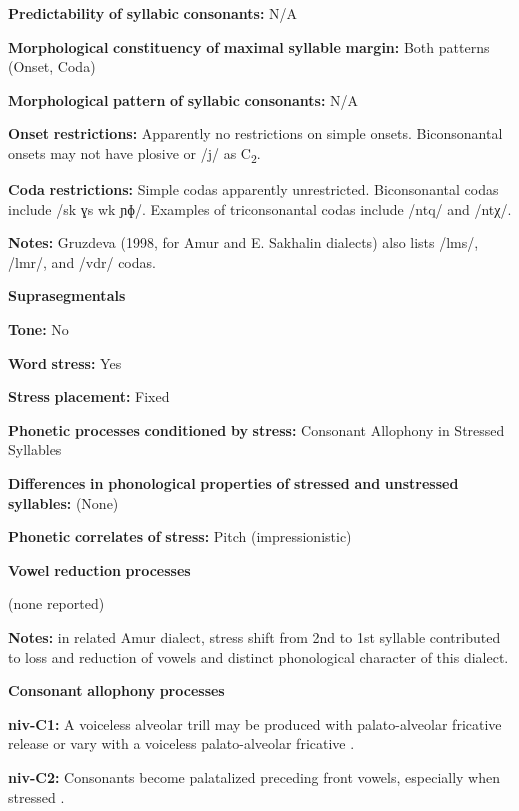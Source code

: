 \begin{styleBody}
\textbf{Predictability} \textbf{of} \textbf{syllabic} \textbf{consonants:} N/A

\textbf{Morphological} \textbf{constituency} \textbf{of} \textbf{maximal} \textbf{syllable} \textbf{margin:} Both patterns (Onset, Coda)

\textbf{Morphological} \textbf{pattern} \textbf{of} \textbf{syllabic} \textbf{consonants:} N/A

\textbf{Onset} \textbf{restrictions:} Apparently no restrictions on simple onsets. Biconsonantal onsets may not have plosive or /j/ as C\textsubscript{2}.

\textbf{Coda} \textbf{restrictions:} Simple codas apparently unrestricted. Biconsonantal codas include /sk ɣs wk ɲɸ/. Examples of triconsonantal codas include /ntq/ and /ntχ/.

\textbf{Notes:} Gruzdeva (1998, for Amur and E. Sakhalin dialects) also lists /lms/, /lmr/, and /vdr/ codas.

\textbf{Suprasegmentals}

\textbf{Tone:} No

\textbf{Word} \textbf{stress:} Yes

\textbf{Stress} \textbf{placement:} Fixed

\textbf{Phonetic} \textbf{processes} \textbf{conditioned} \textbf{by} \textbf{stress:} Consonant Allophony in Stressed Syllables

\textbf{Differences} \textbf{in} \textbf{phonological} \textbf{properties} \textbf{of} \textbf{stressed} \textbf{and} \textbf{unstressed} \textbf{syllables:} (None)

\textbf{Phonetic} \textbf{correlates} \textbf{of} \textbf{stress:} Pitch (impressionistic)

\textbf{Vowel} \textbf{reduction} \textbf{processes}

(none reported)

\textbf{Notes:} in related Amur dialect, stress shift from 2nd to 1st syllable contributed to loss and reduction of vowels and distinct phonological character of this dialect.

\textbf{Consonant} \textbf{allophony} \textbf{processes}

\textbf{niv-C1:} A voiceless alveolar trill may be produced with palato-alveolar fricative release or vary with a voiceless palato-alveolar fricative \citep[26]{Shiraishi2006}.

\textbf{niv-C2:} Consonants become palatalized preceding front vowels, especially when stressed \citep[23]{Shiraishi2006}.


\end{styleBody}
